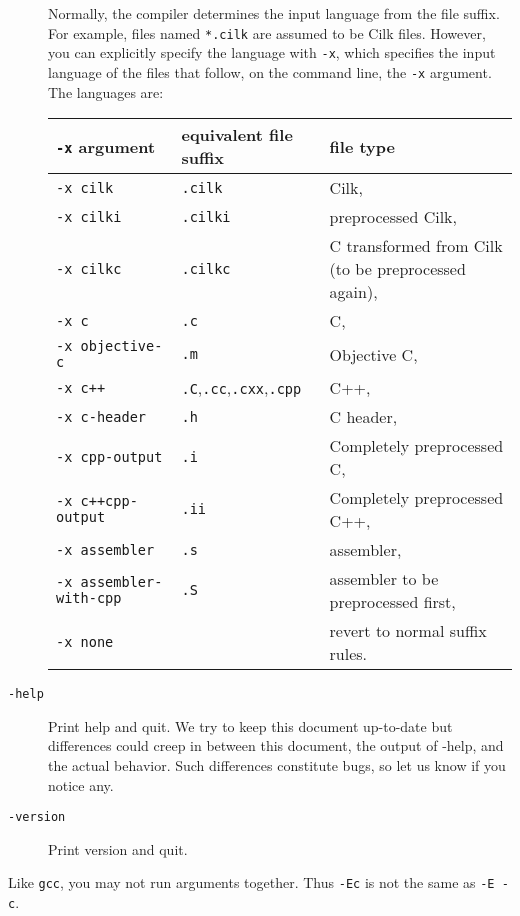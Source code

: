 \begin{description}
Normally, the compiler determines the input language from the file
suffix.  For example, files named \texttt{*.cilk} are assumed to be
Cilk files.  However, you can explicitly specify the language with
\texttt{-x}, which specifies the input language of the files that follow, on the command line, the \texttt{-x} argument.  The languages are:
\begin{center}
\begin{tabular}{llp{3in}}
\texttt{-x} argument & equivalent file suffix & file type \\\hline
\texttt{-x cilk}     & \texttt{.cilk} & Cilk,      \\
\texttt{-x cilki}    & \texttt{.cilki} & preprocessed Cilk,  \\
\texttt{-x cilkc}    & \texttt{.cilkc} & C transformed from Cilk (to be preprocessed again),  \\
\texttt{-x c}        & \texttt{.c} & C,  \\
\texttt{-x objective-c} & \texttt{.m} & Objective C,  \\
\texttt{-x c++} & \texttt{.C},\texttt{.cc},\texttt{.cxx},\texttt{.cpp} & C++,  \\
\texttt{-x c-header} & \texttt{.h} & C header,  \\
\texttt{-x cpp-output} & \texttt{.i} & Completely preprocessed C,  \\
\texttt{-x c++cpp-output} & \texttt{.ii} & Completely preprocessed C++,  \\
\texttt{-x assembler} & \texttt{.s} & assembler,  \\
\texttt{-x assembler-with-cpp} & \texttt{.S} & assembler to be preprocessed first,  \\
\texttt{-x none} & & revert to normal suffix rules.  \\
\end{tabular}
\end{center}

\item[\texttt{-help}\\] Print help and quit.  We try to keep this
document up-to-date but differences could creep in between this
document, the output of -help, and the actual behavior.  Such
differences constitute bugs, so let us know if you notice any.
\item[\texttt{-version}\\] Print version and quit.
\end{description}

Like \texttt{gcc}, you may not run arguments together.  Thus
\texttt{-Ec} is not the same as \texttt{-E -c}.


